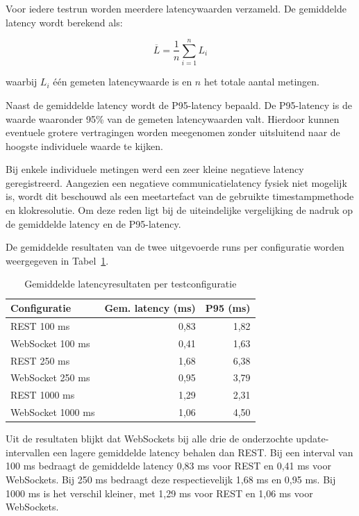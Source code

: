 Voor iedere testrun worden meerdere latencywaarden verzameld. De gemiddelde
latency wordt berekend als:

\begin{equation}
    \overline{L} =
    \frac{1}{n}
    \sum_{i=1}^{n} L_i
\end{equation}

waarbij $L_i$ één gemeten latencywaarde is en $n$ het totale aantal metingen.

Naast de gemiddelde latency wordt de P95-latency bepaald. De P95-latency is de
waarde waaronder 95\% van de gemeten latencywaarden valt. Hierdoor kunnen
eventuele grotere vertragingen worden meegenomen zonder uitsluitend naar de
hoogste individuele waarde te kijken.

Bij enkele individuele metingen werd een zeer kleine negatieve latency
geregistreerd. Aangezien een negatieve communicatielatency fysiek niet mogelijk
is, wordt dit beschouwd als een meetartefact van de gebruikte timestampmethode
en klokresolutie. Om deze reden ligt bij de uiteindelijke vergelijking de
nadruk op de gemiddelde latency en de P95-latency.

De gemiddelde resultaten van de twee uitgevoerde runs per configuratie worden
weergegeven in Tabel~\ref{tab:latency-resultaten}.

\begin{table}[H]
    \centering
    \caption{Gemiddelde latencyresultaten per testconfiguratie}
    \label{tab:latency-resultaten}
    \begin{tabular}{lrr}
        \hline
        \textbf{Configuratie} &
        \textbf{Gem. latency (ms)} &
        \textbf{P95 (ms)} \\
        \hline
        REST 100 ms        & 0,83 & 1,82 \\
        WebSocket 100 ms   & 0,41 & 1,63 \\
        REST 250 ms        & 1,68 & 6,38 \\
        WebSocket 250 ms   & 0,95 & 3,79 \\
        REST 1000 ms       & 1,29 & 2,31 \\
        WebSocket 1000 ms  & 1,06 & 4,50 \\
        \hline
    \end{tabular}
\end{table}

Uit de resultaten blijkt dat WebSockets bij alle drie de onderzochte
update-intervallen een lagere gemiddelde latency behalen dan REST. Bij een
interval van 100 ms bedraagt de gemiddelde latency 0,83 ms voor REST en
0,41 ms voor WebSockets. Bij 250 ms bedraagt deze respectievelijk 1,68 ms en
0,95 ms. Bij 1000 ms is het verschil kleiner, met 1,29 ms voor REST en
1,06 ms voor WebSockets.

